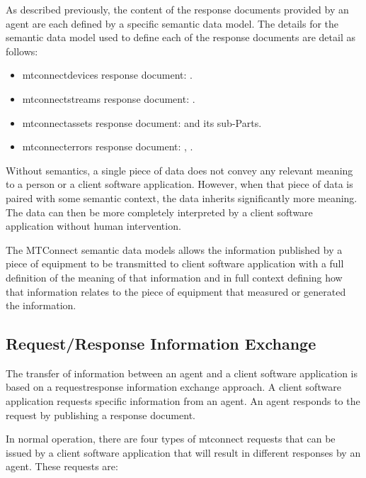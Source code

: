 \documentclass{mtconnect}	%
\begin{document}
As described previously, the content of the \glspl{response document} provided by an \gls{agent} are each defined by a specific \gls{semantic data model}.  The details for the \gls{semantic data model} used to define each of the \glspl{response document} are detail as follows:

\begin{itemize}
\item \gls{mtconnectdevices response document}:  . 

\item \gls{mtconnectstreams response document}:  .

\item \gls{mtconnectassets response document}:   and its sub-Parts.

\item \gls{mtconnecterrors response document}:  , .
\end{itemize}

Without semantics, a single piece of data does not convey any relevant meaning to a person or a client software application.  However, when that piece of data is paired with some semantic context, the data inherits significantly more meaning.  The data can then be more completely interpreted by a client software application without human intervention.

The MTConnect \glspl{semantic data model} allows the information published by a piece of equipment to be transmitted to client software application with a full definition of the meaning of that information and in full context defining how that information relates to the piece of equipment that measured or generated the information.

\subsection{Request/Response Information Exchange}
\label{sec:Request/Response Information Exchange}

The transfer of information between an \gls{agent} and a client software application is based on a \gls{requestresponse} information exchange approach.   A client software application requests specific information from an \gls{agent}.  An \gls{agent} responds to the \gls{request} by publishing a \gls{response document}.

In normal operation, there are four types of \glspl{mtconnect request} that can be issued by a client software application that will result in different \glspl{response} by an \gls{agent}.  These \glspl{request} are:
\end{document}
